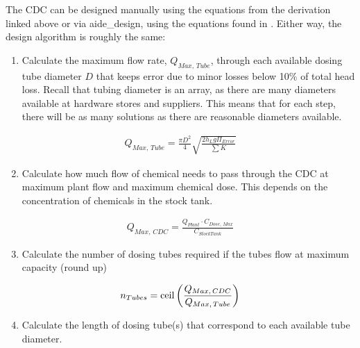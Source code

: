 \documentclass[letterpaper,10pt,english]{sphinxmanual}
\begin{document}
The CDC can be designed manually using the equations from the derivation linked above or via aide\_design, using the equations found in . Either way, the design algorithm is roughly the same:
\begin{enumerate}
\item {} 
Calculate the maximum flow rate, \(Q_{Max, \, Tube}\), through each available dosing tube diameter \(D\) that keeps error due to minor losses below 10\% of total head loss. Recall that tubing diameter is an array, as there are many diameters available at hardware stores and suppliers. This means that for each step, there will be as many solutions as there are reasonable diameters available.

\end{enumerate}
\begin{equation}\label{equation:Flow_Control_and_Measurement/FCM_Design:Flow_Control_and_Measurement/FCM_Design:0}
\begin{split}Q_{Max, \, Tube} = \frac{\pi D^2}{4} \sqrt{\frac{2 h_L g \Pi_{Error}}{\sum{K} }}\end{split}
\end{equation}\begin{enumerate}
\setcounter{enumi}{1}
\item {} 
Calculate how much flow of chemical needs to pass through the CDC at maximum plant flow and maximum chemical dose. This depends on the concentration of chemicals in the stock tank.

\end{enumerate}
\begin{equation}\label{equation:Flow_Control_and_Measurement/FCM_Design:Flow_Control_and_Measurement/FCM_Design:1}
\begin{split}Q_{Max, \, CDC} = \frac{Q_{Plant} \cdot C_{Dose, \, Max}}{C_{StockTank}}\end{split}
\end{equation}\begin{enumerate}
\setcounter{enumi}{2}
\item {} 
Calculate the number of dosing tubes required if the tubes flow at  maximum capacity (round up)

\end{enumerate}
\begin{equation}\label{equation:Flow_Control_and_Measurement/FCM_Design:Flow_Control_and_Measurement/FCM_Design:2}
\begin{split}n_{Tubes} = {\rm ceil} \left( \frac{Q_{Max, \, CDC}}{Q_{Max, \, Tube}} \right)\end{split}
\end{equation}\begin{enumerate}
\setcounter{enumi}{3}
\item {} 
Calculate the length of dosing tube(s) that correspond to each available tube diameter.

\end{enumerate}
\end{document}
